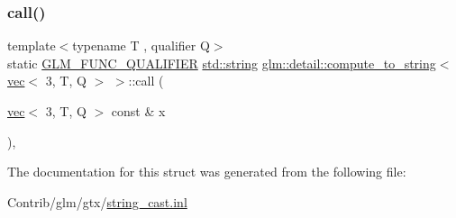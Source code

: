 \subsubsection{\texorpdfstring{call()}{call()}}
{\footnotesize\ttfamily template$<$typename T , qualifier Q$>$ \\
static \mbox{\hyperlink{setup_8hpp_a33fdea6f91c5f834105f7415e2a64407}{G\+L\+M\+\_\+\+F\+U\+N\+C\+\_\+\+Q\+U\+A\+L\+I\+F\+I\+ER}} \mbox{\hyperlink{_s_d_l__opengl__glext_8h_ae84541b4f3d8e1ea24ec0f466a8c568b}{std\+::string}} \mbox{\hyperlink{structglm_1_1detail_1_1compute__to__string}{glm\+::detail\+::compute\+\_\+to\+\_\+string}}$<$ \mbox{\hyperlink{structglm_1_1vec}{vec}}$<$ 3, T, Q $>$ $>$\+::call (\begin{DoxyParamCaption}\item[{\mbox{\hyperlink{structglm_1_1vec}{vec}}$<$ 3, T, Q $>$ const \&}]{x }\end{DoxyParamCaption})\hspace{0.3cm}{\ttfamily [inline]}, {\ttfamily [static]}}



The documentation for this struct was generated from the following file\+:\begin{DoxyCompactItemize}
\item 
Contrib/glm/gtx/\mbox{\hyperlink{string__cast_8inl}{string\+\_\+cast.\+inl}}\end{DoxyCompactItemize}
